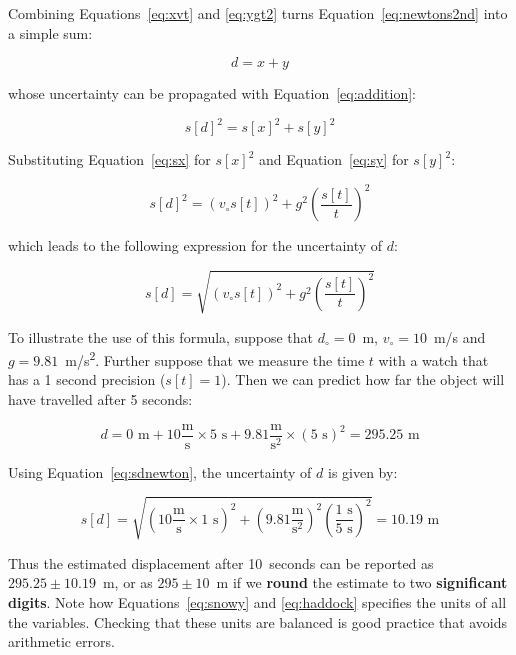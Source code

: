 \begin{enumerate}
  Combining Equations~\ref{eq:xvt} and \ref{eq:ygt2} turns
  Equation~\ref{eq:newtons2nd} into a simple sum:

  \[
  d = x + y
  \]

  \noindent whose uncertainty can be propagated with
  Equation~\ref{eq:addition}:

  \[
  s[d]^2 = s[x]^2 + s[y]^2
  \]

  Substituting Equation~\ref{eq:sx} for $s[x]^2$ and
  Equation~\ref{eq:sy} for $s[y]^2$:

  \[
  s[d]^2 = \left(v_\circ s[t]\right)^2 + g^2 \left(\frac{s[t]}{t}\right)^2
  \]

  \noindent which leads to the following expression for the
  uncertainty of $d$:

  \begin{equation}
    s[d] = \sqrt{\left(v_\circ s[t]\right)^2 + g^2 \left(\frac{s[t]}{t}\right)^2}
    \label{eq:sdnewton}
  \end{equation}

  To illustrate the use of this formula, suppose that $d_\circ=0$~m,
  $v_\circ=10$~m/s and $g=9.81$~m/s\textsuperscript{2}.  Further
  suppose that we measure the time $t$ with a watch that has a 1
  second precision ($s[t]=1$). Then we can predict how far the object
  will have travelled after 5 seconds:

  \begin{equation}
  d = 0 \mbox{~m} +
  10 \frac{\mbox{m}}{\mbox{s}} \times 5 \mbox{~s} +
  9.81\frac{\mbox{m}}{\mbox{s}^2} \times (5 \mbox{~s})^2 = 295.25\mbox{~m}
  \label{eq:snowy}
  \end{equation}

  Using Equation~\ref{eq:sdnewton}, the uncertainty of $d$ is given
  by:

  \begin{equation}
  s[d] = \sqrt{\left(10 \frac{\mbox{m}}{\mbox{s}} \times 1\mbox{~s}\right)^2 +
    \left(9.81\frac{\mbox{m}}{\mbox{s}^2}\right)^2
    \left(\frac{1\mbox{~s}}{5\mbox{~s}}\right)^2} = 10.19\mbox{~m}
  \label{eq:haddock}
  \end{equation}

  Thus the estimated displacement after 10~seconds can be reported as
  $295.25\pm{10.19}$~m, or as $295\pm{10}$~m if we \textbf{round} the
  estimate to two \textbf{significant digits}. Note how
  Equations~\ref{eq:snowy} and \ref{eq:haddock} specifies the units of
  all the variables. Checking that these units are balanced is good
  practice that avoids arithmetic errors.
  
\end{enumerate}

